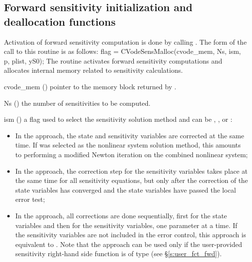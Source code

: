 \subsection{Forward sensitivity initialization and deallocation functions}
\label{ss:sensi_malloc}
Activation of forward sensitivity computation is done by calling
.
The form of the call to this routine is as follows:
{
  flag = CVodeSensMalloc(cvode\_mem, Ns, ism, p, plist, yS0);
}
{
  The routine  activates forward sensitivity computations and
  allocates internal memory related to sensitivity calculations.
}
{
  \begin{args}

  \item[cvode\_mem] ()
    pointer to the {\cvodes} memory block returned by .

  \item[Ns] () 
    the number of sensitivities to be computed.

  \item[ism] ()
    a flag used to select the sensitivity solution method and can 
    be , , or :
    \begin{itemize}
    \item In the  approach, the state and sensitivity variables are
      corrected at the same time. If  was selected as the nonlinear system 
      solution method, this amounts to performing a modified Newton iteration on the
      combined nonlinear system;
    \item In the  approach, the correction step for the sensitivity
      variables takes place at the same time for all sensitivity equations, but only after 
      the correction of the state variables has converged and the state variables 
      have passed the local error test; 
    \item In the  approach, all corrections are done sequentially, first
      for the state variables and then for the sensitivity variables, one parameter at
      a time. If the sensitivity variables are not included in the error control, this 
      approach is equivalent to . Note that the  approach 
      can be used only if the user-provided sensitivity right-hand side function is of type
       (see \S\ref{s:user_fct_fwd}).
    \end{itemize}


\end{args}}
